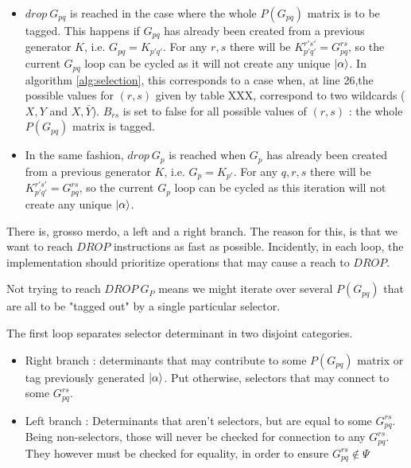 \begin{itemize}
\item
$drop\ G_{pq}$ is reached in the case where the whole $P(G_{pq})$ matrix is to be tagged. This happens if $G_{pq}$ has already been created from a previous generator $K$, i.e. $G_{pq} = K_{p'q'}$. For any $r,s$ there will be $K_{p'q'}^{r's'} = G_{pq}^{rs}$, so the current $G_{pq}$ loop can be cycled as it will not create any unique $| \alpha \rangle$.
In algorithm \ref{alg:selection}, this corresponds to a case when, at line 26,the possible values for $(r,s)$ given by table XXX, correspond to two wildcards ($X,Y$ and $X,\bar Y$). $B_{rs}$ is set to false for all possible values of $(r,s)$ : the whole $P(G_{pq})$ matrix is tagged.
\item
In the same fashion, $drop\ G_{p}$ is reached when $G_{p}$ has already been created from a previous generator $K$, i.e. $G_{p} = K_{p'}$. For any $q,r,s$ there will be $K_{p'q'}^{r's'} = G_{pq}^{rs}$, so the current $G_{p}$ loop can be cycled as this iteration will not create any unique $| \alpha \rangle$.\\
\end{itemize}


There is, grosso merdo, a left and a right branch. The reason for this, is that we want to reach $DROP$ instructions as fast as possible. Incidently, in each loop, the implementation should prioritize operations that may cause a reach to $DROP$.

Not trying to reach $DROP\ G_{P}$ means we might iterate over several $P(G_{pq})$ that are all to be "tagged out" by a single particular selector.

The first loop separates selector determinant in two disjoint categories.

\begin{itemize}
\item
Right branch : determinants that may contribute to some $P(G_{pq})$ matrix or tag previously generated $| \alpha \rangle$. Put otherwise, selectors that may connect to some $G_{pq}^{rs}$.

\item
Left branch : Determinants that aren't selectors, but are equal to some $G_{pq}^{rs}$. Being non-selectors, those will never be checked for connection to any $G_{pq}^{rs}$. They however must be checked for equality, in order to ensure $G_{pq}^{rs} \notin \Psi$
\end{itemize}

